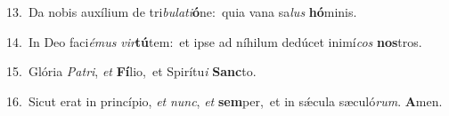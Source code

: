 {\numbfont\textcolor{\numbcolor}{13.}}~Da nobis auxílium de tri\-\textit{bu}\-\textit{la}\textit{ti}\textbf{ó}ne:~\star quia vana sa\textit{lus} \textbf{hó}\-minis.\par
{\numbfont\textcolor{\numbcolor}{14.}}~In Deo faci\-\textit{é}\-\textit{mus} \textit{vir}\-\textbf{tú}tem:~\star et ipse ad níhilum dedúcet inimí\textit{cos} \textbf{nos}\-tros.\par
{\numbfont\textcolor{\numbcolor}{15.}}~Glória \textit{Pa}\-\textit{tri}, \textit{et} \textbf{Fí}\-lio,~\star et Spirítu\textit{i} \textbf{Sanc}\-to.\par
{\numbfont\textcolor{\numbcolor}{16.}}~Sicut erat in princípio, \textit{et} \textit{nunc}\-, \textit{et} \textbf{sem}\-per,~\star et in sǽcula sæculó\-\textit{rum}\-. \textbf{A}\-men.\par
